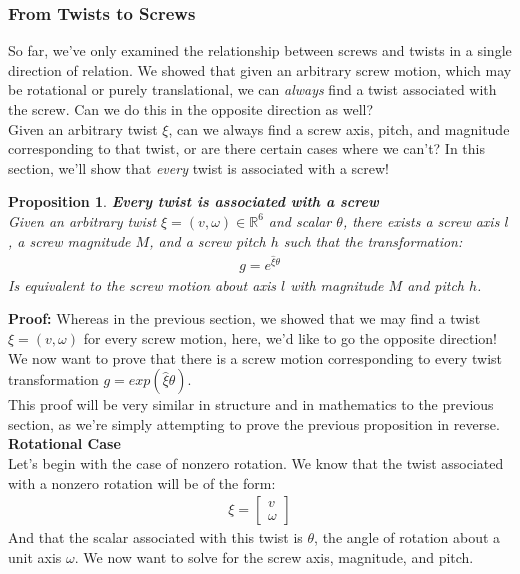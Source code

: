 \documentclass[oneside]{book}
\newtheorem{proposition}{Proposition}
\newenvironment{prop} %
  {\colorlet{shadecolor}{blue!9}\begin{shaded}\begin{proposition}}
  {\end{proposition}\end{shaded}}
\begin{document}
\subsubsection{From Twists to Screws}
So far, we've only examined the relationship between screws and twists in a single direction of relation. We showed that given an arbitrary screw motion, which may be rotational or purely translational, we can \textit{always} find a twist associated with the screw. Can we do this in the opposite direction as well?\\
Given an arbitrary twist $\xi$, can we always find a screw axis, pitch, and magnitude corresponding to that twist, or are there certain cases where we can't? In this section, we'll show that \textit{every} twist is associated with a screw!
\begin{prop}
\textbf{Every twist is associated with a screw}\\
Given an arbitrary twist $\xi = (v, \omega) \in \mathbb{R}^6$ and scalar $\theta$, there exists a screw axis $l$, a screw magnitude $M$, and a screw pitch $h$ such that the transformation:
\begin{align}
    g = e^{\hat\xi\theta}
\end{align}
Is equivalent to the screw motion about axis $l$ with magnitude $M$ and pitch $h$.
\end{prop}
\noindent
\textbf{Proof:}
Whereas in the previous section, we showed that we may find a twist $\xi = (v, \omega)$ for every screw motion, here, we'd like to go the opposite direction! We now want to prove that there is a screw motion corresponding to every twist transformation $g = exp(\hat\xi\theta)$.\\
This proof will be very similar in structure and in mathematics to the previous section, as we're simply attempting to prove the previous proposition in reverse.\\
\textbf{Rotational Case}\\
Let's begin with the case of nonzero rotation. We know that the twist associated with a nonzero rotation will be of the form:
\begin{align}
    \xi = 
    \begin{bmatrix}
        v\\
        \omega
    \end{bmatrix}
\end{align}
And that the scalar associated with this twist is $\theta$, the angle of rotation about a unit axis $\omega$. We now want to solve for the screw axis, magnitude, and pitch.\\
\end{document}
